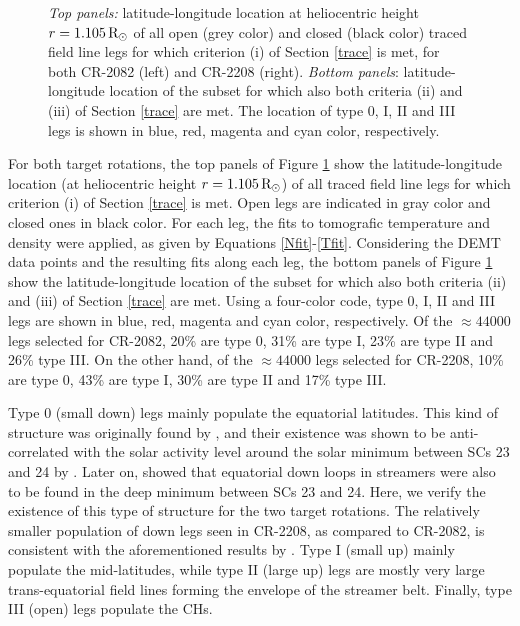 \documentclass[namedreferences]{solarphysics}
\newcommand{\mrsun}{{\rm R_\odot}}
\begin{document}
\begin{article}
\begin{figure}[h!]
\begin{center}
\caption{\emph{Top panels:} {latitude-longitude location at heliocentric height $r=1.105\,\mrsun$ of all open (grey color) and closed (black color) traced field line legs for which criterion (i) of Section \ref{trace} is met, for both CR-2082 (left) and CR-2208 (right). \emph{Bottom panels}: latitude-longitude location of the subset for which also both criteria (ii) and (iii) of Section \ref{trace} are met. {The location of} type 0, I, II and III legs {is shown} in blue, red, {magenta and cyan} color, respectively.}}
\label{rpoint_demt}
\end{center}
\end{figure}

{For both target rotations, the top panels of Figure \ref{rpoint_demt} show the latitude-longitude location (at heliocentric height $r=1.105\,\mrsun$) of all traced field line legs for which criterion (i) of Section \ref{trace} is met. Open legs are indicated in gray color and closed ones in black color. For each leg, the fits to tomografic temperature and density were applied, as given by Equations \ref{Nfit}-\ref{Tfit}. Considering the DEMT data points and the resulting fits along each leg, the bottom panels of Figure \ref{rpoint_demt} show the latitude-longitude location of the subset for which also both criteria (ii) and (iii) of Section \ref{trace} are met. Using a four-color code, type 0, I, II and III legs are shown in blue, red, {magenta and cyan} color, respectively.} Of the {$\approx 44000$} legs selected for CR-2082, 20\% are type 0, 31\% are type I, 23\% are type II and 26\% type III. On the other hand, of the {$\approx 44000$} legs selected for CR-2208, 10\% are type 0, 43\% are type I, 30\% are type II and 17\% type III.

{Type 0 (small down) legs mainly populate the equatorial latitudes. This kind of structure was originally found by \citet{huang_2012}, and their existence was shown to be anti-correlated with the solar activity level around the solar minimum between {SCs 23 and 24} by \citet{nuevo_2013}. Later on, \citet{lloveras_2017} showed {that} equatorial down loops in streamers were also to be found in the deep minimum between SCs {23 and 24}. Here, we verify the existence of this type of structure for the two target rotations. The relatively smaller population of down legs seen in CR-2208, as compared to CR-2082, is consistent with the aforementioned results by \citet{nuevo_2013}. Type I (small up) mainly populate the mid-latitudes, while type II (large up) legs are mostly very large trans-equatorial field lines forming the envelope of the streamer belt. Finally, type III (open) legs populate the CHs.}


\end{article}
\end{document}
